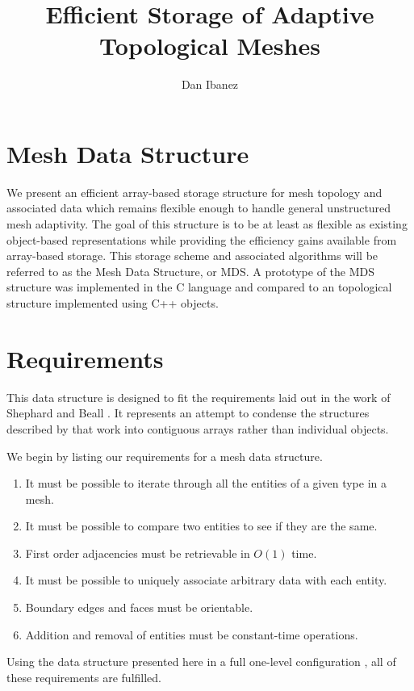 \documentclass{article}
\title{Efficient Storage of Adaptive Topological Meshes}
\author{Dan Ibanez}
\begin{document}
\maketitle

\section{Mesh Data Structure}

We present an efficient array-based storage structure for mesh
topology and associated data which remains flexible enough
to handle general unstructured mesh adaptivity.
The goal of this structure is to be at least as flexible
as existing object-based representations while providing
the efficiency gains available from array-based storage.
This storage scheme and associated algorithms will be
referred to as the Mesh Data Structure, or MDS.
A prototype of the MDS structure was implemented in the C language
and compared to an topological structure implemented
using C++ objects.

\section{Requirements}
\label{sec:req}

This data structure is designed to fit the requirements
laid out in the work of Shephard and Beall \cite{beall1995mesh}.
It represents an attempt to condense the structures described
by that work into contiguous arrays rather than individual objects.

We begin by listing our requirements for a mesh data structure.

\begin{enumerate}
\item It must be possible to iterate through all the entities of
a given type in a mesh.
\item It must be possible to compare two entities to see if they
are the same.
\item First order adjacencies must be retrievable in $O(1)$ time.
\item It must be possible to uniquely associate arbitrary data with each entity.
\item Boundary edges and faces must be orientable.
\item Addition and removal of entities must be constant-time operations.
\end{enumerate}

Using the data structure presented here in a full one-level configuration
\cite{beall1995mesh},
all of these requirements are fulfilled.
\end{document}
